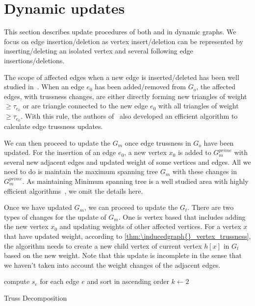 \section{Dynamic updates}
\label{dynamic}

This section describes update procedures of both \inducedgraph{} and \treeindex{} in dynamic graphs. We focus on edge insertion/deletion as vertex insert/deletion can be represented by inserting/deleting an isolated vertex and several following edge insertions/deletions.

The scope of affected edges when a new edge is inserted/deleted has been well studied in~\cite{huang2014querying}. When an edge $e_0$ has been added/removed from $G_o$, the affected edges, \ie with trussness changes, are either directly forming new triangles of weight $\ge \tau_{e_0}$ or are triangle connected to the new edge $e_0$ with all triangles of weight $\ge \tau_{e_0}$. With this rule, the authors of~\cite{huang2014querying} also developed an efficient algorithm to calculate edge trussness updates. 

We can then proceed to update the \inducedgraph{} $G_m$ once edge trussness in $G_o$ have been updated. For the insertion of an edge $e_0$, a new vertex $x_0$ is added to $G_{m}^{prime}$ with several new adjacent edges and updated weight of some vertices and edges. All we need to do is maintain the maximum spanning tree $G_m$ with these changes in $G_{m}^{prime}$. As maintaining Minimum spanning tree is a well studied area with highly efficient algorithms~\cite{cattaneo2002maintaining}, we omit the details here.

Once we have updated $G_m$, we can proceed to update the \treeindex{} $G_t$. There are two types of changes for the update of $G_m$. One is vertex based that includes adding the new vertex $x_0$ and updating weights of other affected vertices. For a vertex $x$ that have updated weight, according to \autoref{thm:\inducedgraph{}_vertex_trussness}, the algorithm needs to create a new child vertex of current vertex $h[x]$ in $G_t$ based on the new weight. Note that this update is incomplete in the sense that we haven't taken into account the weight changes of the adjacent edges.  

\begin{algorithm}
	\BlankLine
	compute $s_e$ for each edge $e$ and sort in ascending order\;
	$k \gets 2$\;
	\caption{Truss Decomposition}\label{alg:truss_decomposition}
\end{algorithm}

